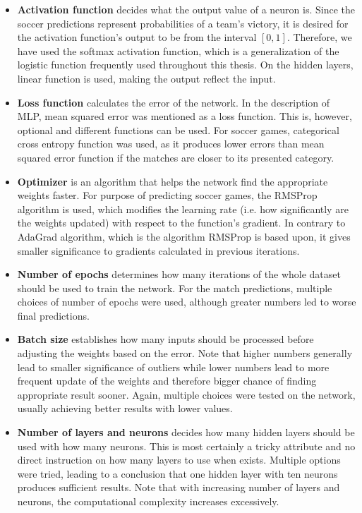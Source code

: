 \begin{itemize}
\item \textbf{Activation function} decides what the output value of a neuron is. Since the soccer predictions represent probabilities of a team's victory, it is desired for the activation function's output to be from the interval $[0, 1]$. Therefore, we have used the softmax activation function, which is a generalization of the logistic function frequently used throughout this thesis. On the hidden layers, linear function is used, making the output reflect the input.

\item \textbf{Loss function} calculates the error of the network. In the description of MLP, mean squared error was mentioned as a loss function. This is, however, optional and different functions can be used. For soccer games, categorical cross entropy function was used, as it produces lower errors than mean squared error function if the matches are closer to its presented category.

\item \textbf{Optimizer} is an algorithm that helps the network find the appropriate weights faster. For purpose of predicting soccer games, the RMSProp algorithm is used, which modifies the learning rate (i.e. how significantly are the weights updated) with respect to the function's gradient. In contrary to AdaGrad algorithm, which is the algorithm RMSProp is based upon, it gives smaller significance to gradients calculated in previous iterations.

\item \textbf{Number of epochs} determines how many iterations of the whole dataset should be used to train the network. For the match predictions, multiple choices of number of epochs were used, although greater numbers led to worse final predictions. 

\item \textbf{Batch size} establishes how many inputs should be processed before adjusting the weights based on the error. Note that higher numbers generally lead to smaller significance of outliers while lower numbers lead to more frequent update of the weights and therefore bigger chance of finding appropriate result sooner. Again, multiple choices were tested on the network, usually achieving better results with lower values.

\item \textbf{Number of layers and neurons} decides how many hidden layers should be used with how many neurons. This is most certainly a tricky attribute and no direct instruction on how many layers to use when exists. Multiple options were tried, leading to a conclusion that one hidden layer with ten neurons produces sufficient results. Note that with increasing number of layers and neurons, the computational complexity increases excessively.
\end{itemize}

